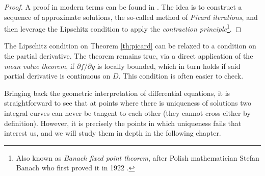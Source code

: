 \begin{proof}
  A proof in modern terms can be found in \cite[36]{teschl2012ordinary}. The idea is to construct a sequence of approximate solutions, the so-called method of \textit{Picard iterations}, and then leverage the Lipschitz condition to apply the \textit{contraction principle}\footnote{Also known as \textit{Banach fixed point theorem}, after Polish mathematician Stefan Banach who first proved it in 1922 \cite{banach1922operations}.}.
\end{proof}

\begin{remark}
  The Lipschitz condition on Theorem \ref{th:picard} can be relaxed to a condition on the partial derivative. The theorem remains true, via a direct application of the \textit{mean value theorem}, if $\partial f / \partial y$ is locally bounded, which in turn holds if said partial derivative is continuous on $D$. This condition is often easier to check.
\end{remark}

Bringing back the geometric interpretation of differential equations, it is straightforward to see that at points where there is uniqueness of solutions two integral curves can never be tangent to each other (they cannot cross either by definition). However, it is precisely the points in which uniqueness fails that interest us, and we will study them in depth in the following chapter.
